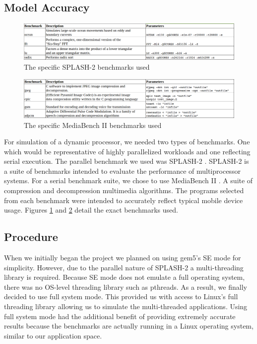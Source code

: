 \subsection{Model Accuracy}
\begin{figure}
    \centering
    \includegraphics[scale=0.3]{../images/splash2.png}
    \caption{The specific SPLASH-2 benchmarks used}
    \label{fig:splash2_benchmarks}
\end{figure}

\begin{figure}
    \centering
    \includegraphics[scale=0.3]{../images/mb2.png}
    \caption{The specific MediaBench II benchmarks used}
    \label{fig:mb2_benchmarks}
\end{figure}
For simulation of a dynamic processor, we needed two types of benchmarks. One which would be representative of highly parallelized workloads and one reflecting serial execution. The parallel benchmark we used was SPLASH-2 \cite{splash2}. SPLASH-2 is a suite of benchmarks intended to evaluate the performance of multiprocessor systems. For a serial benchmark suite, we chose to use MediaBench II \cite{mb2}. A suite of compression and decompression multimedia algorithms. The programs selected from each benchmark were intended to accurately reflect typical mobile device usage. Figures \ref{fig:splash2_benchmarks} and \ref{fig:mb2_benchmarks} detail the exact benchmarks used.

\subsection{Procedure}
When we initially began the project we planned on using gem5's SE mode for simplicity. However, due to the parallel nature of SPLASH-2 a multi-threading library is required. Because SE mode does not emulate a full operating system, there was no OS-level threading library such as pthreads. As a result, we finally decided to use full system mode. This provided us with access to Linux's full threading library allowing us to simulate the multi-threaded applications. Using full system mode had the additional benefit of providing extremely accurate results because the benchmarks are actually running in a Linux operating system, similar to our application space.

